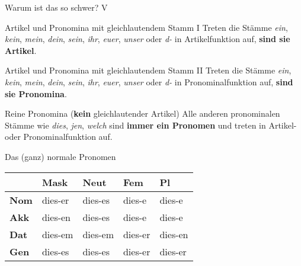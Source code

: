 \begin{frame}
  {Warum ist das so schwer? V}
  \pause
  \begin{block}{Artikel und Pronomina mit gleichlautendem Stamm I}
    Treten die Stämme \textit{ein}, \textit{kein}, \textit{mein}, \textit{dein}, \textit{sein}, \textit{ihr}, \textit{euer}, \textit{unser} oder \textit{d-} in Artikelfunktion auf, \textbf{sind sie Artikel}.
  \end{block}
  \pause
  \begin{block}{Artikel und Pronomina mit gleichlautendem Stamm II}
    Treten die Stämme \textit{ein}, \textit{kein}, \textit{mein}, \textit{dein}, \textit{sein}, \textit{ihr}, \textit{euer}, \textit{unser} oder \textit{d-} in Pronominalfunktion auf, \textbf{sind sie Pronomina}.
  \end{block}
  \Zeile
  \pause
  \begin{block}{Reine Pronomina (\textbf{kein} gleichlautender Artikel)}
    Alle anderen pronominalen Stämme wie \textit{dies}, \textit{jen}, \textit{welch} sind \textbf{immer ein Pronomen} und treten in Artikel- oder Pronominalfunktion auf.
  \end{block}
\end{frame}


\begin{frame}
  {Das (ganz) normale Pronomen}
  \pause
  \begin{center}
    \begin{tabular}{lllll}
      \toprule
      \multicolumn{1}{c}{} & \textbf{Mask} & \textbf{Neut} & \textbf{Fem} & \textbf{Pl} \\
      \midrule
      \textbf{Nom} & dies-er & dies-es & dies-e & dies-e \\
      \textbf{Akk} & dies-en & dies-es & dies-e & dies-e \\
      \textbf{Dat} & dies-em & dies-em & dies-er & dies-en \\
      \textbf{Gen} & dies-es & dies-es & dies-er & dies-er \\
      \bottomrule
    \end{tabular}
  \end{center}
\end{frame}



